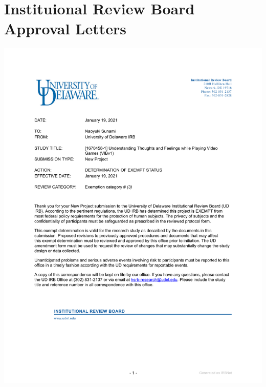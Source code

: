 \documentclass[
]{udthesis}
\begin{document}
\chapter{Instituional Review Board Approval Letters}\label{instituional-review-board-approval-letters}

\includegraphics[width=1\linewidth]{pdf/IRB_letter1}
\end{document}
